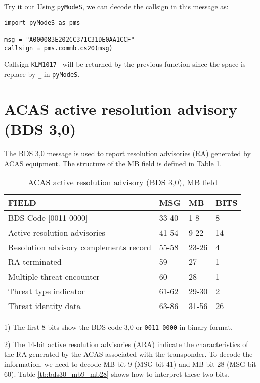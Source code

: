 \begin{notebox}{Try it out}
Using \texttt{pyModeS}, we can decode the callsign in this message as: 

\begin{verbatim}
import pyModeS as pms

msg = "A000083E202CC371C31DE0AA1CCF"
callsign = pms.commb.cs20(msg)
\end{verbatim}

Callsign \texttt{KLM1017\_} will be returned by the previous function since the space is replace by \texttt{\_} in \texttt{pyModeS}.
\end{notebox}


\newpage

\section{ACAS active resolution advisory (BDS 3,0)}

The BDS 3,0 message is used to report resolution advisories (RA) generated by ACAS equipment. The structure of the MB field is defined in Table \ref{tb:bds20}.

\begin{table}[ht]
\centering
\caption{ACAS active resolution advisory (BDS 3,0), MB field}
\label{tb:bds20}
\begin{tabular}{|l|l|l|l|}
\hline
\textbf{FIELD} & \textbf{MSG} & \textbf{MB} & \textbf{BITS} \\ \hline
BDS Code {[}0011 0000{]} & 33-40 & 1-8 & 8 \\ \hline
Active resolution advisories & 41-54 & 9-22 & 14 \\ \hline
Resolution advisory complements record & 55-58 & 23-26 & 4 \\ \hline
RA terminated & 59 & 27 & 1 \\ \hline
Multiple threat encounter & 60 & 28 & 1 \\ \hline
Threat type indicator & 61-62 & 29-30 & 2 \\ \hline
Threat identity data & 63-86 & 31-56 & 26 \\ \hline
\end{tabular}
\end{table}


1) The first 8 bits show the BDS code 3,0 or \texttt{0011 0000} in binary format.

2) The 14-bit active resolution advisories (ARA) indicate the characteristics of the RA generated by the ACAS associated with the transponder. To decode the information, we need to decode MB bit 9 (MSG bit 41) and MB bit 28 (MSG bit 60). Table \ref{tb:bds30_mb9_mb28} shows how to interpret these two bits.

